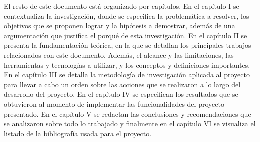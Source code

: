 El resto de este documento está organizado por capítulos. En el capítulo I se contextualiza la investigación, donde se especifica la problemática a resolver, los objetivos que se proponen lograr y la hipótesis a demostrar, además de una argumentación que justifica el porqué de esta investigación. En el capítulo II se presenta la fundamentación teórica, en la que se detallan los principales trabajos relacionados con este documento. Además, el alcance y las limitaciones, las herramientas y tecnologías a utilizar, y los conceptos y definiciones importantes. En el capítulo III se detalla la metodología de investigación aplicada al proyecto para llevar a cabo un orden sobre las acciones que se realizaron a lo largo del desarrollo del proyecto. En el capítulo IV se especifican los resultados que se obtuvieron al momento de implementar las funcionalidades del proyecto presentado. En el capítulo V se redactan las conclusiones y recomendaciones que se analizaron sobre todo lo trabajado y finalmente en el capítulo VI se visualiza el listado de la bibliografía usada para el proyecto. 



